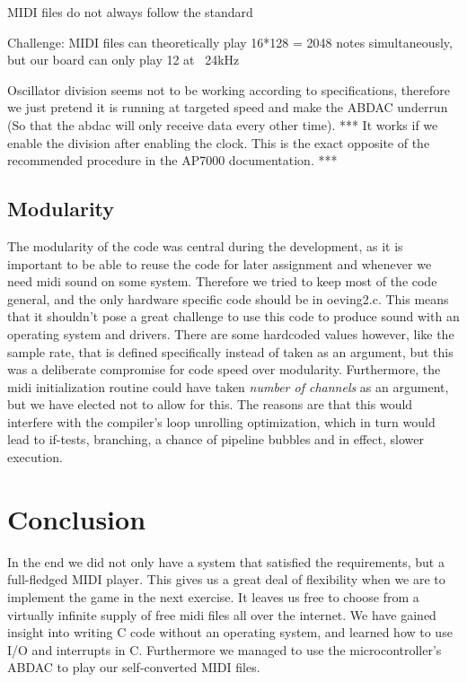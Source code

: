 \documentclass[a4paper,12pt]{article}
\begin{document}
MIDI files do not always follow the standard

Challenge: MIDI files can theoretically play 16*128 = 2048 notes simultaneously, but our board can only play 12 at ~24kHz

Oscillator division seems not to be working according to specifications, therefore we just pretend it is running at targeted speed and make the ABDAC underrun (So that the abdac will only receive data every other time). *** It works if we enable the division after enabling the clock. This is the exact opposite of the recommended procedure in the AP7000 documentation\cite{AP7000}. ***

\subsection{Modularity}

The modularity of the code was central during the development, as it is important to be able to reuse the code for later assignment and whenever we need midi sound on some system. Therefore we tried to keep most of the code general, and the only hardware specific code should be in oeving2.c. This means that it shouldn’t pose a great challenge to use this code to produce sound with an operating system and drivers. There are some hardcoded values however, like the sample rate, that is defined specifically instead of taken as an argument, but this was a deliberate compromise for code speed over modularity. Furthermore, the midi initialization routine could have taken \emph{number of channels} as an argument, but we have elected not to allow for this. The reasons are that this would interfere with the compiler’s loop unrolling optimization, which in turn would lead to if-tests, branching, a chance of pipeline bubbles and in effect, slower execution.


\clearpage
\section{Conclusion}
In the end we did not only have a system that satisfied the requirements, but a full-fledged MIDI player. This gives us a great deal of flexibility when we are to implement the game in the next exercise. It leaves us free to choose from a virtually infinite supply of free midi files all over the internet.
We have gained insight into writing C code without an operating system, and learned how to use I/O and interrupts in C. Furthermore we managed to use the microcontroller’s ABDAC to play our self-converted MIDI files.
\end{document}
